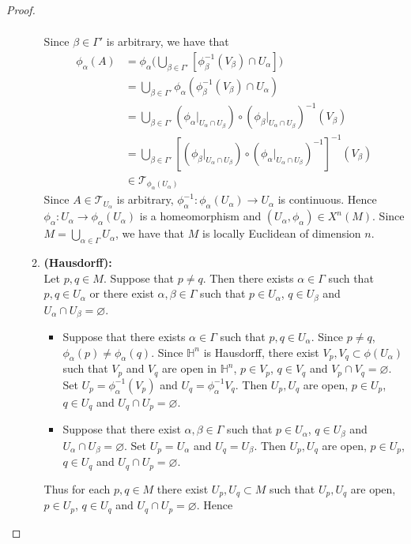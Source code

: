 \documentclass{book}
\theoremstyle{definition}
\newcommand{\al}{\alpha}
\newcommand{\be}{\beta}
\newcommand{\Gam}{\Gamma}
\renewcommand{\H}{\mathbb{H}}
\newcommand{\MT}{\mathcal{T}}
\DeclareMathOperator*{\0}{\mbf{0}}
\DeclareMathOperator*{\1}{\mbf{1}}
\newcommand{\tbf}[1]{\textbf{#1}}
\begin{document}
\begin{proof}
\begin{enumerate}
\begin{enumerate}
\begin{align*}
			\end{align*} 
			Since $\be \in \Gam'$ is arbitrary, we have that
			\begin{align*}
				\phi_{\al}(A)
				& = \phi_{\al} \bigg( \bigcup_{\be \in \Gam'} [\phi_{\be}^{-1}(V_{\be}) \cap U_{\al}] \bigg) \\
				& = \bigcup_{\be \in \Gam'} \phi_{\al}(\phi_{\be}^{-1}(V_{\be}) \cap U_{\al}) \\
				& =  \bigcup_{\be \in \Gam'} (\phi_{\al}|_{U_{\al} \cap U_{\be}}) \circ (\phi_{\be}|_{U_{\al} \cap U_{\be}})^{-1}(V_{\be}) \\
				& =  \bigcup_{\be \in \Gam'} [(\phi_{\be}|_{U_{\al} \cap U_{\be}}) \circ (\phi_{\al}|_{U_{\al} \cap U_{\be}})^{-1}]^{-1}(V_{\be}) \\
				& \in \MT_{\phi_{\al}(U_{\al})}
			\end{align*} 
			Since $A \in \MT_{U_{\al}}$ is arbitrary, $\phi_{\al}^{-1}: \phi_{\al}(U_{\al}) \rightarrow U_{\al}$ is continuous. Hence $\phi_{\al}: U_{\al} \rightarrow \phi_{\al}(U_{\al})$ is a homeomorphism and $(U_{\al}, \phi_{\al}) \in X^n(M)$. Since $M = \bigcup\limits_{\al \in \Gam} U_{\al}$, we have that $M$ is locally Euclidean of dimension $n$.
			\item \tbf{(Hausdorff):} \\
			Let $p, q \in M$. Suppose that $p \neq q$. Then there exists $\al \in \Gam$ such that $p,q \in U_{\al}$ or there exist $\al, \be \in \Gam$ such that $p \in U_{\al}$, $q \in U_{\be}$ and $U_{\al} \cap U_{\be} = \varnothing$.
			\begin{itemize}
				\item Suppose that there exists $\al \in \Gam$ such that $p,q \in U_{\al}$. Since $p \neq q$, $\phi_{\al}(p) \neq \phi_{\al}(q)$. Since $\H^n$ is Hausdorff, there exist $V_p , V_q \subset \phi(U_{\al})$ such that $V_p$ and $V_q$ are open in $\H^n$, $p \in V_p$, $q \in V_q$ and $V_p \cap V_q = \varnothing$. Set $U_p = \phi_{\al}^{-1}(V_p)$ and $U_q = \phi_{\al}^{-1}V_q$. Then $U_p, U_q$ are open, $p \in U_p$, $q \in U_q$ and $U_q \cap U_p = \varnothing$.
				\item Suppose that there exist $\al, \be \in \Gam$ such that $p \in U_{\al}$, $q \in U_{\be}$ and $U_{\al} \cap U_{\be} = \varnothing$. Set $U_p = U_{\al}$ and $U_q = U_{\be}$. Then $U_p, U_q$ are open, $p \in U_p$, $q \in U_q$ and $U_q \cap U_p = \varnothing$.
			\end{itemize}
			Thus for each $p, q \in M$ there exist $U_p, U_q \subset M$ such that $U_p, U_q$ are open, $p \in U_p$, $q \in U_q$ and $U_q \cap U_p = \varnothing$. Hence 

\end{enumerate}
\end{enumerate}
\end{proof}
\end{document}
